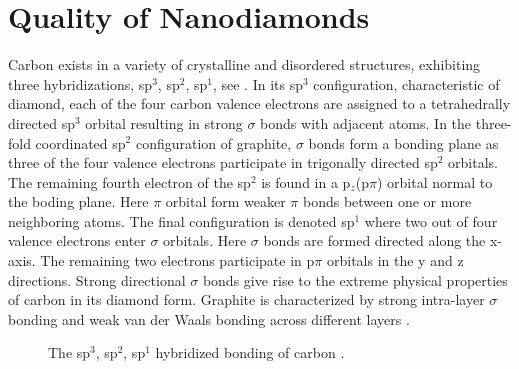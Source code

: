
\chapter{Quality of Nanodiamonds}	\label{ch::crystal_quality}

		Carbon exists in a variety of crystalline and disordered structures, exhibiting three hybridizations, sp$^3$, sp$^2$, sp$^1$, see  . In its sp$^3$ configuration, characteristic of diamond, each of the four carbon valence electrons are assigned to a tetrahedrally directed sp$^3$ orbital resulting in strong $\sigma$ bonds with adjacent atoms.
		In the three-fold coordinated sp$^2$ configuration of graphite, $\sigma$ bonds form a bonding plane as three of the four valence electrons participate in trigonally directed sp$^2$ orbitals. The remaining fourth electron of the sp$^2$ is found in a p$_z$(p$\pi$) orbital normal to the boding plane. Here $\pi$ orbital form weaker $\pi$ bonds between one or more neighboring atoms.
		The final configuration is denoted sp$^1$ where two out of four valence electrons enter $\sigma$ orbitals. Here $\sigma$ bonds are formed directed along the x-axis. The remaining two electrons participate in p$\pi$ orbitals in the y and z directions.
		Strong directional $\sigma$ bonds give rise to the extreme physical properties of carbon in its diamond form. Graphite is characterized by strong intra-layer $\sigma$ bonding and weak van der Waals bonding across different layers \cite{Robertson2002}.

		\begin{figure}[!htb]
			\centering
			\caption[Carbon hybridizations]{The sp$^3$, sp$^2$, sp$^1$ hybridized bonding of carbon \cite{Robertson1986}.}
			\label{fig::c_bonds}
		\end{figure}


